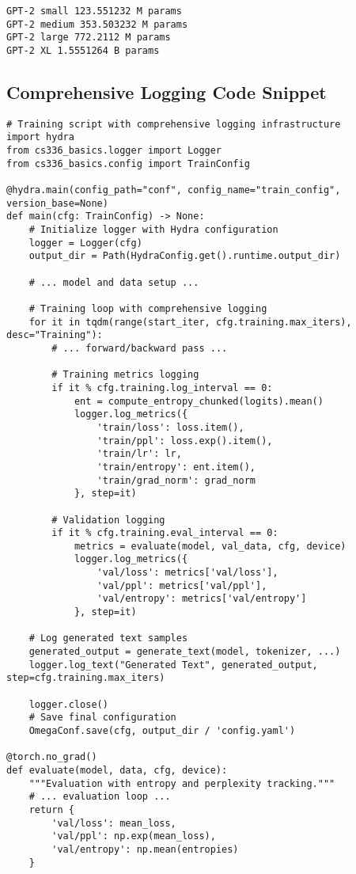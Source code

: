 \begin{lstlisting}
GPT-2 small 123.551232 M params
GPT-2 medium 353.503232 M params
GPT-2 large 772.2112 M params
GPT-2 XL 1.5551264 B params
\end{lstlisting}

\subsection{Comprehensive Logging Code Snippet}
\label{appendix:logging-code}

\begin{lstlisting}
# Training script with comprehensive logging infrastructure
import hydra
from cs336_basics.logger import Logger
from cs336_basics.config import TrainConfig

@hydra.main(config_path="conf", config_name="train_config", version_base=None)
def main(cfg: TrainConfig) -> None:
    # Initialize logger with Hydra configuration
    logger = Logger(cfg)
    output_dir = Path(HydraConfig.get().runtime.output_dir)
    
    # ... model and data setup ...
    
    # Training loop with comprehensive logging
    for it in tqdm(range(start_iter, cfg.training.max_iters), desc="Training"):
        # ... forward/backward pass ...
        
        # Training metrics logging
        if it % cfg.training.log_interval == 0:
            ent = compute_entropy_chunked(logits).mean()
            logger.log_metrics({
                'train/loss': loss.item(), 
                'train/ppl': loss.exp().item(),
                'train/lr': lr,
                'train/entropy': ent.item(),
                'train/grad_norm': grad_norm
            }, step=it)
            
        # Validation logging
        if it % cfg.training.eval_interval == 0:
            metrics = evaluate(model, val_data, cfg, device)
            logger.log_metrics({
                'val/loss': metrics['val/loss'],
                'val/ppl': metrics['val/ppl'], 
                'val/entropy': metrics['val/entropy']
            }, step=it)
    
    # Log generated text samples
    generated_output = generate_text(model, tokenizer, ...)
    logger.log_text("Generated Text", generated_output, step=cfg.training.max_iters)
    
    logger.close()
    # Save final configuration
    OmegaConf.save(cfg, output_dir / 'config.yaml')

@torch.no_grad()
def evaluate(model, data, cfg, device):
    """Evaluation with entropy and perplexity tracking."""
    # ... evaluation loop ...
    return {
        'val/loss': mean_loss,
        'val/ppl': np.exp(mean_loss),
        'val/entropy': np.mean(entropies)
    }
\end{lstlisting}

